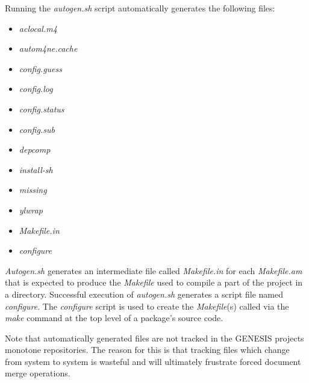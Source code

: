 \documentclass[12pt]{article}
\begin{document}
Running the {\it  autogen.sh} script automatically generates the following files:
\begin{itemize}
	\item {\it aclocal.m4}
	\item {\it autom4ne.cache}
	\item {\it config.guess}
	\item {\it config.log}
	\item {\it config.status}
	\item {\it config.sub}
	\item {\it depcomp}
	\item {\it install-sh}
	\item {\it missing}
	\item {\it ylwrap}

	\item {\it Makefile.in}
	\item {\it configure}
\end{itemize}

{\it Autogen.sh} generates an intermediate file called {\it Makefile.in} for each {\it Makefile.am} that is expected to produce the {\it Makefile} used to compile a part of the project in a directory. Successful execution of {\it autogen.sh} generates a script file named {\it configure}. The {\it configure} script is used to create the {\it Makefile}(s) called via the {\it make} command at the top level of a package's source code.

Note that automatically generated files are not tracked in the GENESIS projects monotone repositories. The reason for this is that tracking files which change from system to system is wasteful and will ultimately frustrate forced document merge operations. 
\end{document}
